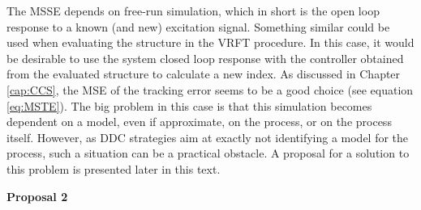 The MSSE depends on free-run simulation, which in short is the open loop response to a known (and new) excitation signal. Something similar could be used when evaluating the structure in the VRFT procedure. In this case, it would be desirable to use the system closed loop response with the controller obtained from the evaluated structure to calculate a new index. As discussed in Chapter \ref{cap:CCS}, the MSE of the tracking error seems to be a good choice (see equation \ref{eq:MSTE}). The big problem in this case is that this simulation becomes dependent on a model, even if approximate, on the process, or on the process itself. However, as DDC strategies aim at exactly not identifying a model for the process, such a situation can be a practical obstacle. A proposal for a solution to this problem is presented later in this text.

\medskip
\textbf{Proposal 2} 

